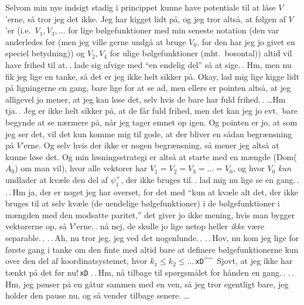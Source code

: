 \documentclass{report}
\begin{document}
Selvom min nye indsigt stadig i princippet kunne have potentiale til at låse $V$'erne, så tror jeg det ikke. Jeg har kigget lidt på, og jeg tror altså, at følgen af $V$'er (i.e.\ $V_1, V_3, \ldots$ for lige bølgefunktioner med min seneste notation (den var anderledes før (men jeg ville gerne undgå at bruge $V_0$, for den har jeg jo givet en speciel betydning)) og $V_2, V_4$ for ulige bølgefunktioner (mht.\ bosontal)) altid vil have frihed til at.\,. lade sig afvige med ``en endelig del'' så at sige.\,. Hm, men nu fik jeg lige en tanke, så det er jeg ikke helt sikker på. Okay, lad mig lige kigge lidt på ligningerne en gang, bare lige for at se ad, men ellers er pointen altså, at jeg alligevel jo mener, at jeg kan løse det, selv hvis de bare har fuld frihed.\,. \ldots Hm tja.\,. Jeg er ikke helt sikker på, at de får fuld frihed, men det kan jeg jo evt.\ bare begynde at se nærmere på, når jeg tager emnet op igen. Og pointen er jo, at som jeg ser det, vil det kun komme mig til gode, at der bliver en sådan begrænsning på $V$'erne. Og selv hvis der ikke er nogen begrænsning, så mener jeg altså at kunne løse det. Og min løsningsstrategi er altså at starte med en mængde (Dom($A_0$) om man vil), hvor alle vektorer har $V_1 = V_2 = V_3 = \ldots = V_0$, og hvor $V_0$ \emph{kun} undlader at kvæle den del af $\psi_1^+$, der ikke bruges til.\,. lad mig nu lige se en gang.\,. .\,.\,Hm ja, der er noget jeg har overset, for det med ``kun at kvæle alt det, der ikke bruges til at selv kvæle (de uendelige bølgefunktioner) i de bølgefunktioner i mængden med den modsatte paritet,'' det giver jo ikke mening, hvis man bygger vektorerne op, så $V$'erne.\,. nå nej, de skulle jo lige netop heller \emph{ikke} være separable.\,. .\,.\,Ah, nu tror jeg, jeg ved det nogenlunde.\,. .\,.\,Hov, nu kom jeg lige for første gang i tanke om den finte med altid bare at definere bølgefunktionerne kun over den del af koordinatsystemet, hvor $k_1\leq k_2 \leq \ldots$\,\texttt{xD}\textasciicircum\textasciicircum\ Sjovt, at jeg ikke har tænkt på det før nu!\,\texttt{xD} .\,.\,Hm, nå tilbage til spørgsmålet for hånden en gang.\,. .\,.\,Hm, jeg pønser på en gåtur sammen med en ven, så jeg tror egentligt bare, jeg holder den pause nu, og så vender tilbage senere. \ldots 
\end{document}

